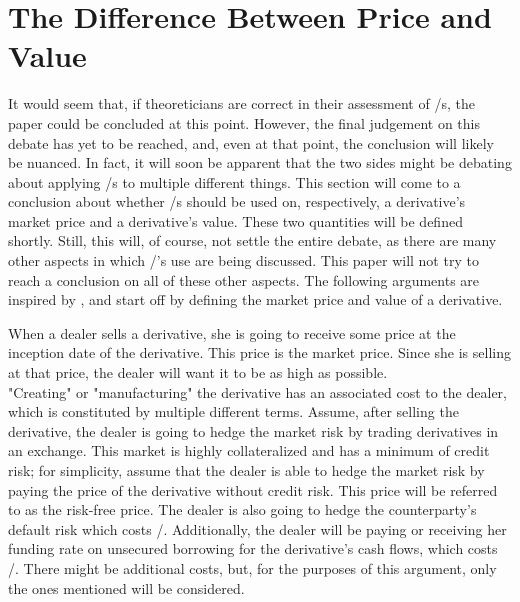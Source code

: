 \documentclass[main.tex]{subfiles}
\begin{document}
    \section{The Difference Between Price and Value}
    \label{sec:price-versus-value}

    It would seem that, if theoreticians are correct in their assessment of \FVA/s,
    the paper could be concluded at this point.
    However, the final judgement on this debate has yet to be reached,
    and, even at that point, the conclusion will likely be nuanced.
    In fact, it will soon be apparent that the two sides might be debating
    about applying \FVA/s to multiple different things.
    This section will come to a conclusion about whether \FVA/s should be used
    on, respectively, a derivative's market price and a derivative's value.
    These two quantities will be defined shortly. 
    Still, this will, of course, not settle the entire debate,
    as there are many other aspects in which \FVA/'s use are being discussed.
    This paper will not try to reach a conclusion on all of these other aspects.
    The following arguments are inspired by \textcite{Ruiz2015XVA},
    and start off by defining the market price and value of a derivative.

    When a dealer sells a derivative, she is going to receive some price at the inception date of the derivative.
    This price is the market price.
    Since she is selling at that price, the dealer will want it to be as high as possible.
    \\
    "Creating" or "manufacturing" the derivative has an associated cost to the dealer,
    which is constituted by multiple different terms.
    Assume, after selling the derivative, the dealer is going to hedge the market risk
    by trading derivatives in an exchange.
    This market is highly collateralized and has a minimum of credit risk;
    for simplicity, assume that the dealer is able to hedge the market risk by paying
    the price of the derivative without credit risk. 
    This price will be referred to as the risk-free price.
    The dealer is also going to hedge the counterparty's default risk which costs \CVA/.
    Additionally, the dealer will be paying or receiving her funding rate on unsecured borrowing
    for the derivative's cash flows, which costs \FVA/.
    There might be additional costs, 
    but, for the purposes of this argument, only the ones mentioned will be considered.
    
\end{document}

